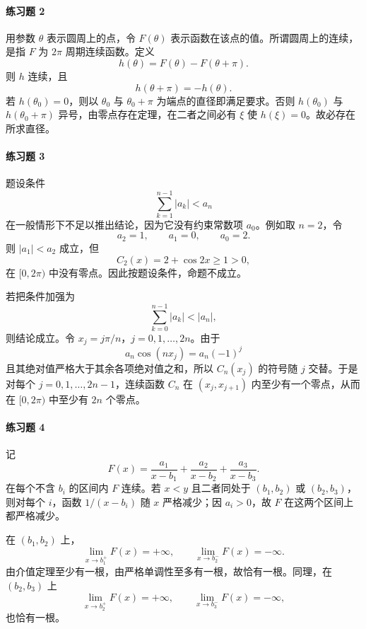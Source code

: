 \paragraph{练习题 2}
\begin{xsolution}
用参数 $\theta$ 表示圆周上的点，令 $F(\theta)$ 表示函数在该点的值。所谓圆周上的连续，是指 $F$ 为 $2\pi$ 周期连续函数。定义
\[
 h(\theta)=F(\theta)-F(\theta+\pi).
\]
则 $h$ 连续，且
\[
 h(\theta+\pi)=-h(\theta).
\]
若 $h(\theta_0)=0$，则以 $\theta_0$ 与 $\theta_0+\pi$ 为端点的直径即满足要求。否则 $h(\theta_0)$ 与 $h(\theta_0+\pi)$ 异号，由零点存在定理，在二者之间必有 $\xi$ 使 $h(\xi)=0$。故必存在所求直径。
\end{xsolution}

\paragraph{练习题 3}
\begin{xsolution}
题设条件
\[
 \sum_{k=1}^{n-1}|a_k|<a_n
\]
在一般情形下不足以推出结论，因为它没有约束常数项 $a_0$。例如取 $n=2$，令
\[
 a_2=1,\qquad a_1=0,\qquad a_0=2.
\]
则 $|a_1|<a_2$ 成立，但
\[
 C_2(x)=2+\cos2x\ge1>0,
\]
在 $[0,2\pi)$ 中没有零点。因此按题设条件，命题不成立。

若把条件加强为
\[
 \sum_{k=0}^{n-1}|a_k|<|a_n|,
\]
则结论成立。令 $x_j=j\pi/n$，$j=0,1,\ldots,2n$。由于
\[
 a_n\cos(nx_j)=a_n(-1)^j
\]
且其绝对值严格大于其余各项绝对值之和，所以 $C_n(x_j)$ 的符号随 $j$ 交替。于是对每个 $j=0,1,\ldots,2n-1$，连续函数 $C_n$ 在 $(x_j,x_{j+1})$ 内至少有一个零点，从而在 $[0,2\pi)$ 中至少有 $2n$ 个零点。
\end{xsolution}

\paragraph{练习题 4}
\begin{xsolution}
记
\[
 F(x)=\frac{a_1}{x-b_1}+\frac{a_2}{x-b_2}+\frac{a_3}{x-b_3}.
\]
在每个不含 $b_i$ 的区间内 $F$ 连续。若 $x<y$ 且二者同处于 $(b_1,b_2)$ 或 $(b_2,b_3)$，则对每个 $i$，函数 $1/(x-b_i)$ 随 $x$ 严格减少；因 $a_i>0$，故 $F$ 在这两个区间上都严格减少。

在 $(b_1,b_2)$ 上，
\[
 \lim_{x\to b_1^+}F(x)=+\infty,
 \qquad
 \lim_{x\to b_2^-}F(x)=-\infty.
\]
由介值定理至少有一根，由严格单调性至多有一根，故恰有一根。同理，在 $(b_2,b_3)$ 上
\[
 \lim_{x\to b_2^+}F(x)=+\infty,
 \qquad
 \lim_{x\to b_3^-}F(x)=-\infty,
\]
也恰有一根。
\end{xsolution}

